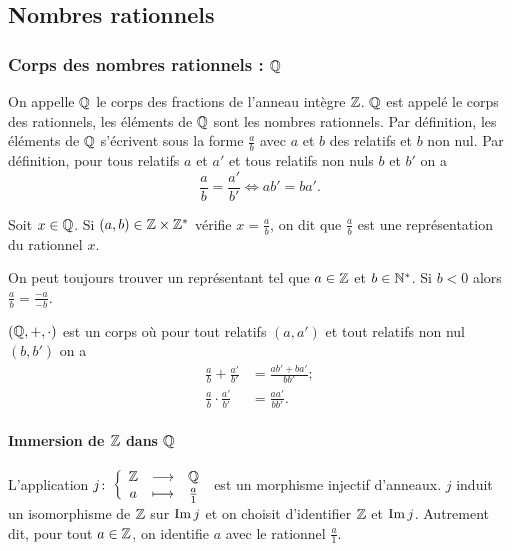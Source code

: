 \subsection{Nombres rationnels}

\subsubsection{Corps des nombres rationnels : \(\mathbb{Q}\)}

\begin{defdef}
  On appelle \(\mathbb{Q}\) le corps des fractions de l'anneau intègre \(\mathbb{Z}\). \(\mathbb{Q}\) est appelé le corps des rationnels, les éléments de \(\mathbb{Q}\) sont les nombres rationnels. Par définition, les éléments de \(\mathbb{Q}\) s'écrivent sous la forme \(\frac{a}{b}\) avec \(a\) et \(b\) des relatifs et \(b\) non nul. Par définition, pour tous relatifs \(a\) et \(a'\) et tous relatifs non nuls \(b\) et \(b'\) on a
  \begin{equation}
    \frac{a}{b} = \frac{a'}{b'} \iff ab'=ba'.
  \end{equation}
\end{defdef}
\begin{defdef}
  Soit \(x \in \mathbb{Q}\). Si \((a,b) \in \mathbb{Z} \times \mathbb{Z}^*\) vérifie \(x=\frac{a}{b}\), on dit que \(\frac{a}{b}\) est une représentation du rationnel \(x\).
\end{defdef}

On peut toujours trouver un représentant tel que \(a \in \mathbb{Z}\) et \(b \in \mathbb{N}^*\). Si \(b <0\) alors \(\frac{a}{b}=\frac{-a}{-b}\).

\((\mathbb{Q}, +, \cdot)\) est un corps où pour tout relatifs \((a,a')\) et tout relatifs non nul \((b,b')\) on a
\begin{align}
  \frac{a}{b}+\frac{a'}{b'} &= \frac{ab'+ba'}{bb'}; \\
  \frac{a}{b} \cdot \frac{a'}{b'} &= \frac{aa'}{bb'}.
\end{align}

\paragraph{Immersion de \(\mathbb{Z}\) dans \(\mathbb{Q}\)}

L'application \(j\colon \left\{\begin{array}{ccc} \mathbb{Z} & \longrightarrow &\mathbb{Q}\\ a & \longmapsto & \frac{a}{1} \end{array} \right.\) est un morphisme injectif d'anneaux. \(j\) induit un isomorphisme de \(\mathbb{Z}\) sur \(\operatorname{Im}{j}\) et on choisit d'identifier \(\mathbb{Z}\) et \(\operatorname{Im}{j}\). Autrement dit, pour tout \(a \in \mathbb{Z}\), on identifie \(a\) avec le rationnel \(\frac{a}{1}\).

